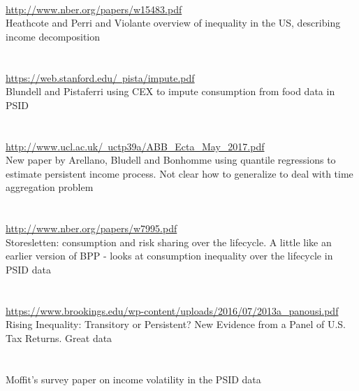 \documentclass[titlepage,abstract]{econtex}
\begin{document}
\cite{heathcote_unequal_2010} \\
\href{url}{http://www.nber.org/papers/w15483.pdf} \\
Heathcote and Perri and Violante overview of inequality in the US, describing income decomposition\\
\\
\cite{noauthor_imputing_nodate} \\
\href{url}{https://web.stanford.edu/~pista/impute.pdf} \\
Blundell and Pistaferri using CEX to impute consumption from food data in PSID\\
\\
\cite{arellano_earnings_2017} \\
\href{url}{http://www.ucl.ac.uk/~uctp39a/ABB\_Ecta\_May\_2017.pdf} \\
New paper by Arellano, Bludell and Bonhomme using quantile regressions to estimate persistent income process. Not clear how to generalize to deal with time aggregation problem \\
\\
\cite{storesletten_consumption_2004} \\
\href{url}{http://www.nber.org/papers/w7995.pdf} \\
Storesletten: consumption and risk sharing over the lifecycle. A little like an earlier version of BPP - looks at consumption inequality over the lifecycle in PSID data \\
\\
\cite{vidangos_rising_2013} \\
\href{url}{https://www.brookings.edu/wp-content/uploads/2016/07/2013a\_panousi.pdf} \\
Rising Inequality: Transitory or Persistent? New Evidence from a Panel of U.S. Tax Returns. Great data \\
\\
\cite{moffitt_income_2018} \\
Moffit's survey paper on income volatility in the PSID data
\end{document}
